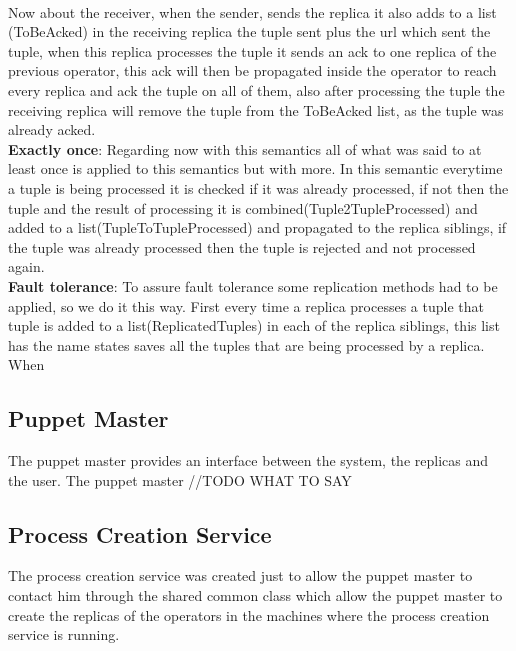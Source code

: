 \documentclass[times, 10pt, twocolumn]{article}
\begin{document}
\\Now about the receiver, when the sender, sends the replica it also adds to a list (ToBeAcked) in the receiving replica the tuple sent plus the url which sent the tuple, when this replica processes the tuple it sends an ack to one replica of the previous operator, this ack will then be propagated inside the operator to reach every replica and ack the tuple on all of them, also after processing the tuple the receiving replica will remove the tuple from the ToBeAcked list, as the tuple was already acked.
\\\textbf{Exactly once}: Regarding now with this semantics all of what was said to at least once is applied to this semantics but with more. In this semantic everytime a tuple is being processed it is checked if it was already processed, if not then the tuple and the result of processing it is combined(Tuple2TupleProcessed) and added to a list(TupleToTupleProcessed) and propagated to the replica siblings, if the tuple was already processed then the tuple is rejected and not processed again.
\\\textbf{Fault tolerance}: To assure fault tolerance some replication methods had to be applied, so we do it this way. First every time a replica processes a tuple that tuple is added to a list(ReplicatedTuples) in each of the replica siblings, this list has the name states saves all the tuples that are being processed by a replica. When 




\subsection{Puppet Master}
The puppet master provides an interface between the system, the replicas and the user.
The puppet master 
//TODO WHAT TO SAY




\subsection{Process Creation Service}
The process creation service was created just to allow the puppet master to contact him through the shared common class which allow the puppet master to create the replicas of the operators in the machines where the process creation service is running.



\end{document}
